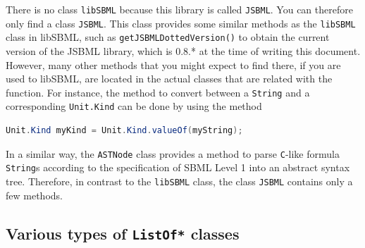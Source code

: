 There is no class \texttt{libSBML} because this library is called
\texttt{JSBML}.
%
You can therefore only find a class \texttt{JSBML}.
%
This class provides some similar methods as the \texttt{libSBML} class in
libSBML, such as \texttt{getJSBMLDottedVersion()}
%
to obtain the current version of the JSBML library, which is 0.8.* at the time of
writing this document. However, many other methods that you might expect
to find there, if you are used to libSBML, are located in the actual classes
that are related with the function. For instance, the method to convert between
a \texttt{String}
%
%
and a corresponding \texttt{Unit.Kind}
%
can be done by using the method
\begin{lstlisting}[language=Java,numbers=none]
Unit.Kind myKind = Unit.Kind.valueOf(myString);
\end{lstlisting}
In a similar way, the \texttt{ASTNode} class provides a method to parse
\texttt{C}-like
formula \texttt{String}s according to the specification of SBML Level 1
\citep{Hucka2003} into an abstract syntax tree. Therefore, in contrast to the
\texttt{libSBML} class, the class \texttt{JSBML}
%
contains only a few methods.


\subsection{Various types of \texttt{ListOf*} classes}


